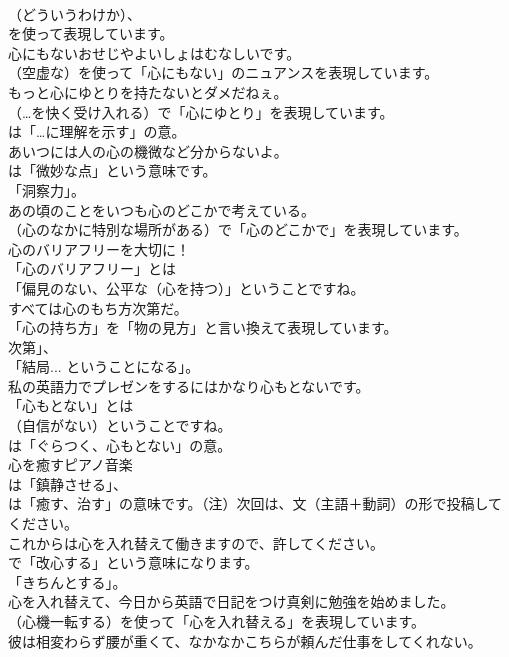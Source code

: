 \documentclass[8pt]{extreport}
\begin{document}
\begin{CJK}{UTF8}{min}
\\	（どういうわけか）、
\\	を使って表現しています。	
\\	心にもないおせじやよいしょはむなしいです。 
\\	（空虚な）を使って「心にもない」のニュアンスを表現しています。	
\\	もっと心にゆとりを持たないとダメだねぇ。 
\\	（…を快く受け入れる）で「心にゆとり」を表現しています。
\\	は「…に理解を示す」の意。	
\\	あいつには人の心の機微など分からないよ。 
\\	は「微妙な点」という意味です。
\\	「洞察力」。	
\\	あの頃のことをいつも心のどこかで考えている。 
\\	（心のなかに特別な場所がある）で「心のどこかで」を表現しています。	
\\	心のバリアフリーを大切に！ 
\\	「心のバリアフリー」とは
\\	「偏見のない、公平な（心を持つ）」ということですね。	
\\	すべては心のもち方次第だ。 
\\	「心の持ち方」を「物の見方」と言い換えて表現しています。
\\	次第」、
\\	「結局... ということになる」。	
\\	私の英語力でプレゼンをするにはかなり心もとないです。 
\\	「心もとない」とは
\\	（自信がない）ということですね。
\\	は「ぐらつく、心もとない」の意。	
\\	心を癒すピアノ音楽 
\\	は「鎮静させる」、
\\	は「癒す、治す」の意味です。（注）次回は、文（主語＋動詞）の形で投稿してください。	
\\	これからは心を入れ替えて働きますので、許してください。 
\\	で「改心する」という意味になります。
\\	「きちんとする」。	
\\	心を入れ替えて、今日から英語で日記をつけ真剣に勉強を始めました。 
\\	（心機一転する）を使って「心を入れ替える」を表現しています。	
\\	彼は相変わらず腰が重くて、なかなかこちらが頼んだ仕事をしてくれない。 

\end{CJK}
\end{document}
